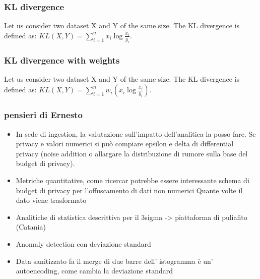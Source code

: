 \subsubsection{KL divergence} Let us consider two dataset X and Y of the same size. The KL divergence is defined as: $KL(X,Y) = \sum_{i=1}^{n}x_i \log \frac{x_i}{y_i}$.
\subsubsection{KL divergence with weights} Let us consider two dataset X and Y of the same size. The KL divergence is defined as: $KL(X,Y) = \sum_{i=1}^{n}w_i(x_i \log \frac{x_i}{y_i})$.


\subsubsection{pensieri di Ernesto}
\begin{itemize}
    \item In sede di ingestion, la valutazione sull'impatto dell'analitica la posso fare. Se privacy e valori numerici si può compiare epsilon e delta di differential privacy (noise addition o allargare la distribuzione di rumore sulla base del budget di privacy).
    \item Metriche quantitative, come ricercar potrebbe essere interessante schema di budget di privacy per l'offuscamento di dati non numerici Quante volte il dato viene trasformato
    \item Analitiche di statistica descrittiva per il 3sigma -> piattaforma di puliafito (Catania)
    \item Anomaly detection con deviazione standard
    \item Data sanitizzato fa il merge di due barre dell' istogramma è un' autoencoding, come cambia la deviazione standard
\end{itemize}
